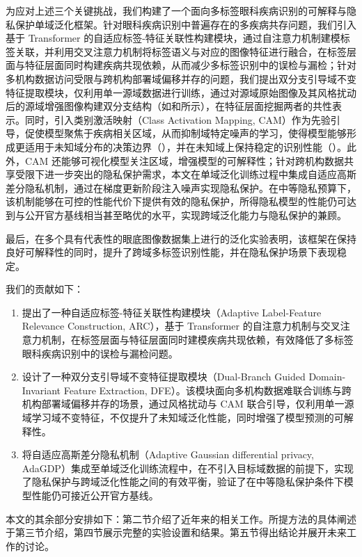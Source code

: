为应对上述三个关键挑战，我们构建了一个面向多标签眼科疾病识别的可解释与隐私保护单域泛化框架。针对眼科疾病识别中普遍存在的多疾病共存问题，我们引入基于 Transformer 的自适应标签-特征关联性构建模块，通过自注意力机制建模标签关联，并利用交叉注意力机制将标签语义与对应的图像特征进行融合，在标签层面与特征层面同时构建疾病共现依赖，从而减少多标签识别中的误检与漏检；针对多机构数据访问受限与跨机构部署域偏移并存的问题，我们提出双分支引导域不变特征提取模块，仅利用单一源域数据进行训练，通过对源域原始图像及其风格扰动后的源域增强图像构建双分支结构（如和所示），在特征层面挖掘两者的共性表示。同时，引入类别激活映射（Class Activation Mapping, CAM）作为先验引导，促使模型聚焦于疾病相关区域，从而抑制域特定噪声的学习，使得模型能够形成更适用于未知域分布的决策边界（），并在未知域上保持稳定的识别性能（）。此外，CAM 还能够可视化模型关注区域，增强模型的可解释性；针对跨机构数据共享受限下进一步突出的隐私保护需求，本文在单域泛化训练过程中集成自适应高斯差分隐私机制，通过在梯度更新阶段注入噪声实现隐私保护。在中等隐私预算下，该机制能够在可控的性能代价下提供有效的隐私保护，所得隐私模型的性能仍可达到与公开官方基线相当甚至略优的水平，实现跨域泛化能力与隐私保护的兼顾。

最后，在多个具有代表性的眼底图像数据集上进行的泛化实验表明，该框架在保持良好可解释性的同时，提升了跨域多标签识别性能，并在隐私保护场景下表现稳定。


我们的贡献如下：

\begin{enumerate}
\item 提出了一种自适应标签-特征关联性构建模块（Adaptive Label-Feature Relevance Construction, ARC），基于 Transformer 的自注意力机制与交叉注意力机制，在标签层面与特征层面同时建模疾病共现依赖，有效降低了多标签眼科疾病识别中的误检与漏检问题。

\item 设计了一种双分支引导域不变特征提取模块（Dual-Branch Guided Domain-Invariant Feature Extraction, DFE）。该模块面向多机构数据难联合训练与跨机构部署域偏移并存的场景，通过风格扰动与 CAM 联合引导，仅利用单一源域学习域不变特征，不仅提升了未知域泛化性能，同时增强了模型预测的可解释性。

\item 将自适应高斯差分隐私机制（Adaptive Gaussian differential privacy, AdaGDP）集成至单域泛化训练流程中，在不引入目标域数据的前提下，实现了隐私保护与跨域泛化性能之间的有效平衡，验证了在中等隐私保护条件下模型性能仍可接近公开官方基线。
\end{enumerate}

本文的其余部分安排如下：第二节介绍了近年来的相关工作。所提方法的具体阐述于第三节介绍，第四节展示完整的实验设置和结果。第五节得出结论并展开未来工作的讨论。
